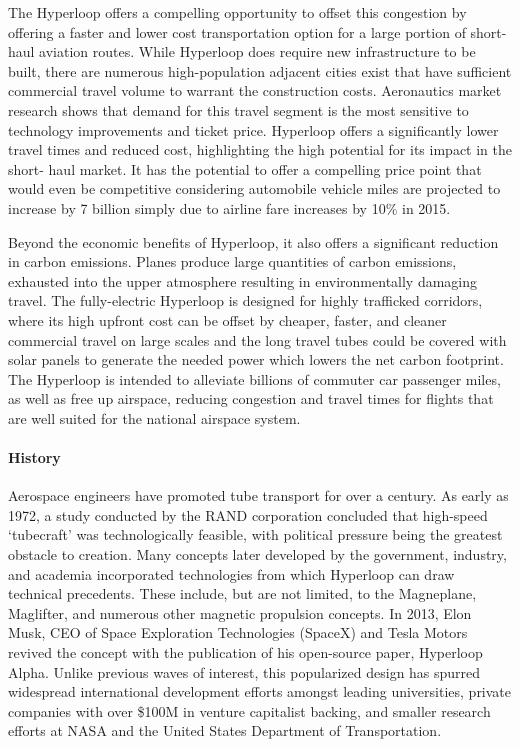 	The Hyperloop offers a compelling opportunity to offset this congestion by
	offering a faster and lower cost transportation option for a large portion
	of short-haul aviation routes. While Hyperloop does require new
	infrastructure to be built, there are numerous high-population adjacent
	cities exist that have sufficient commercial travel volume to warrant the
	construction costs. Aeronautics market research shows that demand for this
	travel segment is the most sensitive to technology improvements and ticket
	price.\cite{Baik} Hyperloop offers a significantly lower travel times and
	reduced cost, highlighting the high potential for its impact in the short-
	haul market. It has the potential to offer a compelling price point that
	would even be competitive considering automobile vehicle miles are
	projected to increase by 7 billion simply due to airline fare increases by
	10\% in 2015.

	Beyond the economic benefits of Hyperloop, it also offers a significant
	reduction in carbon emissions. Planes produce large quantities of carbon
	emissions, exhausted into the upper atmosphere resulting in
	environmentally damaging travel. The fully-electric Hyperloop is designed
	for highly trafficked corridors, where its high upfront cost can be
	offset by cheaper, faster, and cleaner commercial travel on large scales
	and the long travel tubes could be covered with solar panels to generate
	the needed power which lowers the net carbon footprint. The Hyperloop is
	intended to alleviate billions of commuter car passenger miles, as well as
	free up airspace, reducing congestion and travel times for flights that
	are well suited for the national airspace system.\\

\paragraph{History}

	Aerospace engineers have promoted tube transport for over a century.
	As early as 1972, a study conducted by the RAND corporation concluded that high-speed 
	`tubecraft' was technologically feasible, with political pressure being the greatest
	obstacle to creation.\cite{RAND} Many concepts later developed by
	the government, industry, and academia incorporated technologies from which
	Hyperloop can draw technical precedents.
	These include, but are not limited, to the Magneplane, Maglifter, and numerous
	other magnetic propulsion concepts. In 2013, Elon Musk, CEO of Space Exploration
	Technologies (SpaceX) and Tesla Motors revived the concept with the publication
	of his open-source paper, Hyperloop Alpha.\cite{Musk}
	Unlike previous waves of interest, this popularized design has spurred widespread international
	development efforts amongst leading universities, private companies with over
	\$100M in venture capitalist backing, and smaller research efforts at NASA and the
	United States Department of Transportation. \cite{Chin}

